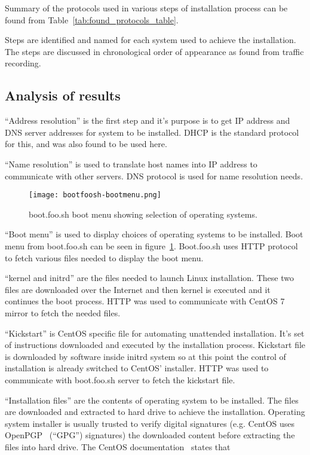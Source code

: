 Summary of the protocols used in various steps of installation process
can be found from Table~\ref{tab:found_protocols_table}.

Steps are identified and named for each system used to achieve the
installation. The steps are discussed in chronological order of
appearance as found from traffic recording.

\subsection{Analysis of results}

``Address resolution'' is the first step and it's purpose is to get IP
address and DNS server addresses for system to be installed. DHCP is
the standard protocol for this, and was also found to be used here.

``Name resolution'' is used to translate host names into IP address to
communicate with other servers. DNS protocol is used for name
resolution needs.

\begin{figure}[h]
  \texttt{[image: bootfoosh-bootmenu.png]}
  \caption{boot.foo.sh boot menu showing selection of operating
    systems.\label{fig:bootmenu}}
\end{figure}

``Boot menu'' is used to display choices of operating systems to be
installed. Boot menu from boot.foo.sh can be seen in
figure~\ref{fig:bootmenu}. Boot.foo.sh uses HTTP protocol to fetch
various files needed to display the boot menu.

``kernel and initrd'' are the files needed to launch Linux
installation. These two files are downloaded over the Internet and
then kernel is executed and it continues the boot process. HTTP was
used to communicate with CentOS 7 mirror to fetch the needed files.

``Kickstart'' is CentOS specific file for automating unattended
installation. It's set of instructions downloaded and executed by the
installation process. Kickstart file is downloaded by software inside
initrd system so at this point the control of installation is already
switched to CentOS' installer. HTTP was used to communicate with
boot.foo.sh server to fetch the kickstart file.

``Installation files'' are the contents of operating system to be
installed. The files are downloaded and extracted to hard drive to
achieve the installation. Operating system installer is usually
trusted to verify digital signatures (e.g. CentOS uses
OpenPGP~\cite{RFC4880} (``GPG'') signatures) the downloaded content
before extracting the files into hard drive. The CentOS
documentation~\cite{centos-gpg} states that

